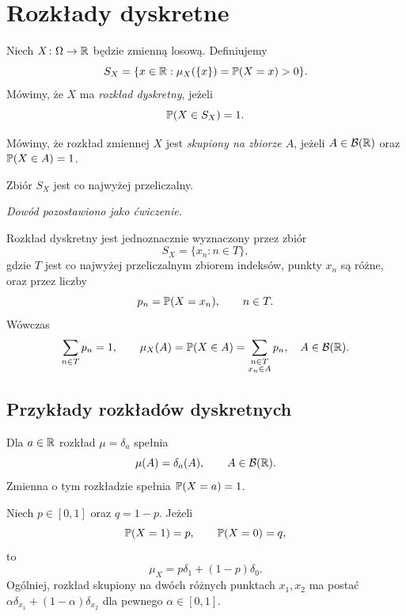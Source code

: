 \section{Rozkłady dyskretne}
\label{sec:rozklady-dyskretne}

\begin{definicja}
\label{def:rozklad-dyskretny}
Niech $X\colon\Omega\to\mathbb{R}$ będzie zmienną losową. Definiujemy
\[
  S_X=\{x\in\mathbb{R}:\mu_X(\{x\})=\mathbb{P}(X=x)>0\}.
\]
Mówimy, że $X$ ma \emph{rozkład dyskretny}, jeżeli
\[
  \mathbb{P}(X\in S_X)=1.
\]
\end{definicja}

\begin{uwaga}
Mówimy, że rozkład zmiennej $X$ jest \emph{skupiony na zbiorze $A$},
jeżeli $A\in\mathcal{B}(\mathbb{R})$ oraz $\mathbb{P}(X\in A)=1$.
\end{uwaga}

\begin{fakt}
\label{fakt:przeliczalnosc-atomow}
Zbiór $S_X$ jest co najwyżej przeliczalny.
\end{fakt}
\noindent\emph{Dowód pozostawiono jako ćwiczenie.}

\begin{fakt}
\label{fakt:opis-rozkladu-dyskretnego}
Rozkład dyskretny jest jednoznacznie wyznaczony przez zbiór
\[
  S_X=\{x_n:n\in T\},
\]
gdzie $T$ jest co najwyżej przeliczalnym zbiorem indeksów, punkty $x_n$
są różne, oraz przez liczby
\[
  p_n=\mathbb{P}(X=x_n),\qquad n\in T.
\]
Wówczas
\[
  \sum_{n\in T}p_n=1,
  \qquad
  \mu_X(A)=\mathbb{P}(X\in A)=\sum_{\substack{n\in T\\x_n\in A}}p_n,
  \quad A\in\mathcal{B}(\mathbb{R}).
\]
\end{fakt}

\subsection{Przykłady rozkładów dyskretnych}
\label{subsec:przyklady-rozkladow-dyskretnych}

\begin{przyklad}
Dla $a\in\mathbb{R}$ rozkład $\mu=\delta_a$ spełnia
\[
  \mu(A)=\delta_a(A),\qquad A\in\mathcal{B}(\mathbb{R}).
\]
Zmienna o tym rozkładzie spełnia $\mathbb{P}(X=a)=1$.
\end{przyklad}

\begin{przyklad}
Niech $p\in[0,1]$ oraz $q=1-p$. Jeżeli
\[
  \mathbb{P}(X=1)=p,\qquad\mathbb{P}(X=0)=q,
\]
to
\[
  \mu_X=p\delta_1+(1-p)\delta_0.
\]
Ogólniej, rozkład skupiony na dwóch różnych punktach $x_1,x_2$ ma postać
$\alpha\delta_{x_1}+(1-\alpha)\delta_{x_2}$ dla pewnego $\alpha\in[0,1]$.
\end{przyklad}

